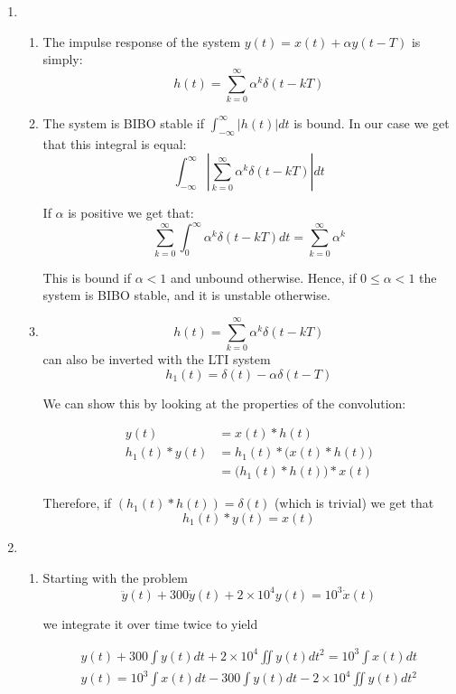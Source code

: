 \documentclass[]{article}
\date{}
\begin{document}
\begin{enumerate}
\def\labelenumi{\arabic{enumi})}
\item
  \begin{enumerate}
  \def\labelenumii{\alph{enumii}.}
  \item
    The impulse response of the system \(y(t) = x(t) + \alpha y(t - T)\)
    is simply: \[
        h(t) = \sum_{k = 0}^\infty \alpha^k \delta(t - kT)
    \]
  \item
    The system is BIBO stable if \(\int_{-\infty}^\infty |h(t)|dt\) is
    bound. In our case we get that this integral is equal: \[
        \int_{-\infty}^\infty \left| 
            \sum_{k = 0}^\infty \alpha^k \delta(t - kT)
        \right| dt
    \]

    If \(\alpha\) is positive we get that: \[
        \sum_{k = 0}^\infty \int_0^\infty \alpha^k \delta(t - kT)dt  = 
            \sum_{k = 0}^\infty \alpha^k
    \]

    This is bound if \(\alpha < 1\) and unbound otherwise. Hence, if
    \(0 \leq \alpha < 1\) the system is BIBO stable, and it is unstable
    otherwise.
  \item
    \[
        h(t) = \sum_{k = 0}^\infty \alpha^k \delta(t - kT)
    \] can also be inverted with the LTI system \[
        \boxed{h_1(t) = \delta(t) - \alpha \delta(t - T)}
    \]

    We can show this by looking at the properties of the convolution:

    \begin{align*}
        y(t) &= x(t) * h(t) \\
        h_1(t) * y(t) &= h_1(t) * \Big( x(t) * h(t) \Big) \\
        &= \Big( h_1(t) * h(t) \Big) * x(t)
    \end{align*}

    Therefore, if \((h_1(t) * h(t)) = \delta(t)\) (which is trivial) we
    get that \[
        h_1(t) * y(t)  = x(t)
    \]
  \end{enumerate}
\item
  \begin{enumerate}
  \def\labelenumii{\alph{enumii}.}
  \item
    Starting with the problem \[
        \ddot{y}(t) + 300\dot{y}(t) + 2 \times 10^4 y(t) = 10^3 \dot{x}(t)
    \]

    we integrate it over time twice to yield

    \begin{align*}
        y(t) + 300\int y(t) dt + 2 \times 10^4 \iint y(t) dt^2 = 10^3 \int x(t) dt \\
        y(t) = 10^3 \int x(t) dt - 300\int y(t) dt - 2 \times 10^4 \iint y(t) dt^2
    \end{align*}


\end{enumerate}
\end{enumerate}
\end{document}
